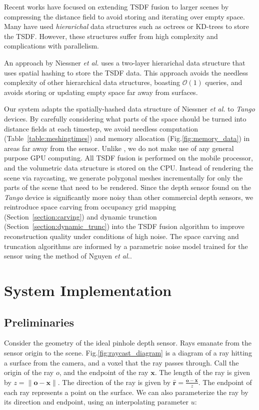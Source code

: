 \documentclass[conference]{IEEEtran}
\newcommand{\sref}[1]{Section~\ref{#1}}
\newcommand{\figref}[1]{Fig.\ref{#1}}
\newcommand{\tabref}[1]{Table~\ref{#1}}
\newcommand{\etal}{\textit{et al.}\xspace}
\newcommand{\Tango}{\textit{Tango}\xspace}
\newcommand{\TSDF}{TSDF\xspace}
\begin{document}
Recent works have focused on extending \TSDF fusion to larger scenes by
compressing the distance field to avoid storing and iterating
over empty space. Many have used \textit{hierarichal} data structures such as
octrees or KD-trees to store the \TSDF \cite{Zeng2012, Chen2012}. However, these
structures suffer from high complexity and complications with parallelism. 

An approach by Niessner \etal \cite{NiessnerHashing} uses a two-layer
hierarichal data structure that uses spatial hashing \cite{SpatialHashing} to
store the \TSDF data. This approach avoids the needless complexity of other
hierarchical data structures, boasting $\mathcal{O}(1)$ queries, and avoids
storing or updating empty space far away from surfaces.

Our system adapts the spatially-hashed data structure of
Niessner \etal \cite{NiessnerHashing} to \Tango devices. By carefully
considering what parts of the space should be turned into distance fields at
each timestep, we avoid needless computation (\tabref{table:meshingtimes}) and
memory allocation (\figref{fig:memory_data}) in areas far away from the sensor.
Unlike \cite{NiessnerHashing}, we do not make use of any general purpose GPU
computing. All \TSDF fusion is performed on the mobile processor, and the
volumetric data structure is stored on the CPU. Instead of rendering the scene
via raycasting, we generate polygonal meshes incrementally for only the parts
of the scene that need to be rendered. Since the depth sensor found on the
\Tango device is significantly more noisy than other commercial depth
sensors, we reintroduce space carving \cite{Elfes1989} from occupancy grid
mapping (\sref{section:carving}) and dynamic trunction
(\sref{section:dynamic_trunc}) into the \TSDF fusion algorithm to improve
reconstruction quality under conditions of high noise. The space carving and
truncation algorithms are informed by a parametric noise model trained for the
sensor using the method of Nguyen \etal \cite{Nguyen2012}.

\section{System Implementation} 
\subsection{Preliminaries}
\label{section:prelim}
Consider the geometry of the ideal pinhole depth sensor. Rays emanate from the
sensor origin to the scene.  \figref{fig:raycast_diagram} is a diagram of a ray hitting a
 surface from the camera, and a voxel that the ray passes through.  Call  the
 origin of the ray $o$, and the endpoint of the ray $\mathbf{x}$.
The length of the ray is given by $z = \|\mathbf{o}
- \mathbf{x}\|$. The direction of the ray is given by $\mathbf{\hat{r}} =
\frac{\mathbf{o} - \mathbf{x}}{z}$. The endpoint of each ray represents a point
on the surface.  We can also parameterize the ray by its direction and
endpoint, using an interpolating parameter $u$:
\end{document}
